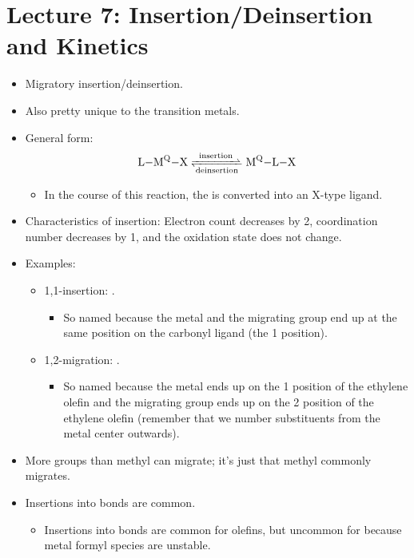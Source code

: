 \documentclass[../notes.tex]{subfiles}
\begin{document}
\section{Lecture 7: Insertion/Deinsertion and Kinetics}
\begin{itemize}
    \item {}Migratory insertion/deinsertion.
    \item Also pretty unique to the transition metals.
    \item General form:
    \begin{equation*}
        \ce{L-M^Q-X <=>[{insertion}][{deinsertion}] M^Q-L-X}
    \end{equation*}
    \begin{itemize}
        \item In the course of this reaction, the  is converted into an X-type ligand.
    \end{itemize}
    \item Characteristics of insertion: Electron count decreases by 2, coordination number decreases by 1, and the oxidation state does not change.
    \item Examples:
    \begin{itemize}
        \item 1,1-insertion: .
        \begin{itemize}
            \item So named because the metal and the migrating group end up at the same position on the carbonyl ligand (the 1 position).
        \end{itemize}
        \item 1,2-migration: .
        \begin{itemize}
            \item So named because the metal ends up on the 1 position of the ethylene olefin and the migrating group ends up on the 2 position of the ethylene olefin (remember that we number substituents from the metal center outwards).
        \end{itemize}
    \end{itemize}
    \item More groups than methyl can migrate; it's just that methyl commonly migrates.
    \item Insertions into  bonds are common.
    \begin{itemize}
        \item Insertions into  bonds are common for olefins, but uncommon for  because metal formyl species are unstable.

\end{itemize}
\end{itemize}
\end{document}
